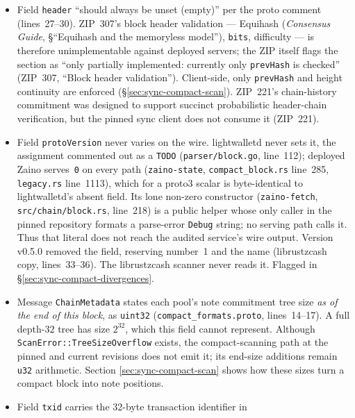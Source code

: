 \documentclass[11pt,a4paper]{article}
\theoremstyle{definition}
\begin{document}
\begin{itemize}
\item Field \texttt{header} ``should always be unset (empty)'' per the
  proto comment (lines~27--30). ZIP~307's block header validation ---
  Equihash (\emph{Consensus Guide}, \S``Equihash and the memoryless
  model''), \texttt{bits}, difficulty --- is therefore unimplementable
  against deployed servers; the ZIP itself flags the section
  as ``only partially implemented: currently only \texttt{prevHash} is
  checked'' (ZIP~307, ``Block header validation''). Client-side, only
  \texttt{prevHash} and height continuity are enforced
  (\S\ref{sec:sync-compact-scan}). ZIP~221's chain-history commitment was
  designed to support succinct probabilistic header-chain verification,
  but the pinned sync client does not consume it (ZIP~221).
\item Field \texttt{protoVersion} never varies on the wire.
  \textsf{lightwalletd} never sets it, the assignment commented out as a
  \texttt{TODO} (\texttt{parser/block.go}, line~112); deployed
  \textsf{Zaino} serves~\texttt{0} on every path (\texttt{zaino-state},
  \texttt{compact\_block.rs} line~285, \texttt{legacy.rs} line~1113),
  which for a proto3 scalar is byte-identical to lightwalletd's absent
  field. Its lone non-zero constructor (\texttt{zaino-fetch},
  \texttt{src/chain/block.rs}, line~218) is a public helper whose only
  caller in the pinned repository formats a parse-error \texttt{Debug}
  string; no serving path calls it. Thus that literal does not reach
  the audited service's wire output. Version v0.5.0 removed
  the field, reserving number~1 and the name (\textsf{librustzcash} copy,
  lines~33--36). The \textsf{librustzcash} scanner never reads it. Flagged
  in \S\ref{sec:sync-compact-divergences}.
\item Message \texttt{ChainMetadata} states each pool's note commitment tree
  size \emph{as of the end of this block}, as \texttt{uint32}
  (\texttt{compact\_formats.proto}, lines~14--17). A full depth-$32$
  tree has size $2^{32}$, which this field cannot represent. Although
  \texttt{ScanError::TreeSizeOverflow} exists, the compact-scanning path at
  the pinned and current revisions does not emit it; its end-size additions
  remain \texttt{u32} arithmetic. Section
  \ref{sec:sync-compact-scan} shows how these sizes turn a compact block
  into note positions.
\item Field \texttt{txid} carries the 32-byte transaction identifier in

\end{itemize}
\end{document}
